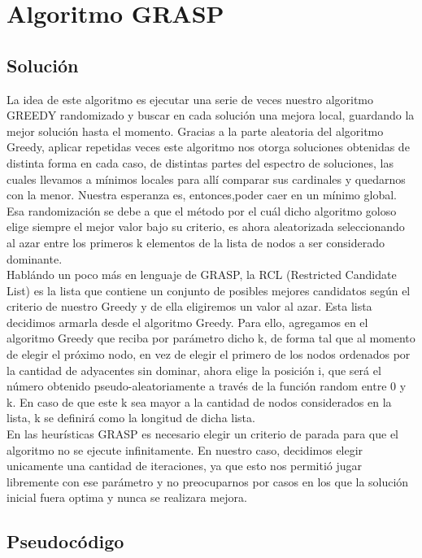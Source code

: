 \section{Algoritmo GRASP}


\subsection{Solución}
La idea de este algoritmo es ejecutar una serie de veces nuestro algoritmo GREEDY randomizado y buscar en cada solución una mejora local, guardando la mejor solución hasta el momento.
Gracias a la parte aleatoria del algoritmo Greedy, aplicar repetidas veces este algoritmo nos otorga soluciones obtenidas de distinta forma en cada caso, de distintas partes del espectro de soluciones, las cuales llevamos a mínimos locales para allí comparar sus cardinales y quedarnos con la menor. Nuestra esperanza es, entonces,poder caer en un mínimo global.
Esa randomización se debe a que el método por el cuál dicho algoritmo goloso elige siempre el mejor valor bajo su criterio, es ahora aleatorizada seleccionando al azar entre los primeros k elementos de la
lista de nodos a ser considerado dominante.\\
Hablándo un poco más en lenguaje de GRASP, la RCL (Restricted Candidate List) es la lista que contiene un conjunto de posibles mejores candidatos según el criterio de nuestro Greedy y de ella eligiremos un valor al azar. Esta lista decidimos armarla desde el algoritmo Greedy.
Para ello, agregamos en el algoritmo Greedy que reciba por parámetro dicho k, de forma tal que al momento de elegir el próximo nodo, en vez de elegir el primero de los nodos ordenados por la cantidad de adyacentes
sin dominar, ahora elige la posición i, que será el número obtenido pseudo-aleatoriamente a través de la función random entre 0 y k. En caso de que este k sea mayor a la cantidad de nodos considerados en la lista, 
k se definirá como la longitud de dicha lista.\\
En las heurísticas GRASP es necesario elegir un criterio de parada para que el algoritmo no se ejecute infinitamente. En nuestro caso, decidimos elegir unicamente
una cantidad de iteraciones, ya que esto nos permitió jugar libremente con ese parámetro y no preocuparnos por casos en los que
la solución inicial fuera optima y nunca se realizara mejora.


\subsection{Pseudocódigo}


